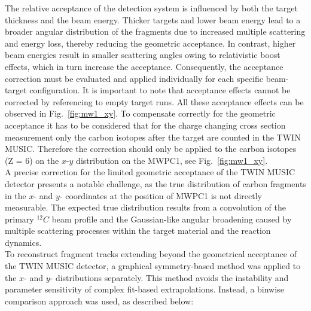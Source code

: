 The relative acceptance of the detection system is influenced by both the target thickness and the beam energy. Thicker targets and lower beam energy lead to a broader angular distribution of the fragments due to increased multiple scattering and energy loss, thereby reducing the geometric acceptance. In contrast, higher beam energies result in smaller scattering angles owing to relativistic boost effects, which in turn increase the acceptance. Consequently, the acceptance correction must be evaluated and applied individually for each specific beam-target configuration. It is important to note that acceptance effects cannot be corrected by referencing to empty target runs. All these acceptance effects can be observed in Fig.~\ref{fig:mw1_xy}.\newline
To compensate correctly for the geometric acceptance it has to be considered that for the charge changing cross section measurement only the carbon isotopes after the target are counted in the TWIN MUSIC. Therefore the correction should only be applied to the carbon isotopes (Z = 6) on the $x$-$y$ distribution on the MWPC1, see Fig.~\ref{fig:mw1_xy}.\\
A precise correction for the limited geometric acceptance of the TWIN MUSIC detector presents a notable challenge, as the true distribution of carbon fragments in the $x$- and $y$- coordinates at the position of MWPC1 is not directly measurable. The expected true distribution results from a convolution of the primary $^{12}C$ beam profile and the Gaussian-like angular broadening caused by multiple scattering processes within the target material and the reaction dynamics.\\
To reconstruct fragment tracks extending beyond the geometrical acceptance of the TWIN MUSIC detector, a graphical symmetry-based method was applied to the $x$- and $y$- distributions separately. This method avoids the instability and parameter sensitivity of complex fit-based extrapolations. Instead, a binwise comparison approach was used, as described below:
